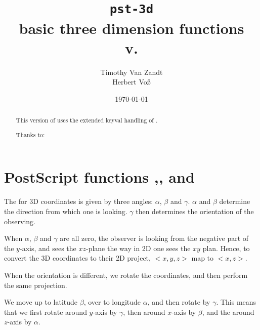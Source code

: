\documentclass[11pt,english,BCOR10mm,DIV12,bibliography=totoc,parskip=false,smallheadings
    headexclude,footexclude,oneside,dvipsnames,svgnames]{pst-doc}
\let\pstFV\fileversion
\def\la{<}
\def\ra{>}
\begin{document}
\title{\texttt{pst-3d}\\basic three dimension functions \\\small v.\pstFV}
\author{Timothy Van Zandt\\Herbert Vo\ss}
\date{\today}

\maketitle

\begin{abstract}
This version of  uses the extended keyval handling
of .

\vfill
\noindent
Thanks to:  
\end{abstract}

\clearpage
\tableofcontents

\clearpage

\section[PostScript]{PostScript functions ,, and }
The  for 3D coordinates is given by three angles: $\alpha$, $\beta$ and
 $\gamma$. $\alpha$ and $\beta$ determine the direction from which one is
 looking. $\gamma$ then determines the orientation of the observing.

 When $\alpha$, $\beta$ and $\gamma$ are all zero, the observer is looking
 from the negative part of the $y$-axis, and sees the $xz$-plane the way in
 2D one sees the $xy$ plan. Hence, to convert the 3D coordinates to their 2D
 project, $\la x, y, z\ra$ map to $\la x, z\ra$.

 When the orientation is different, we rotate the coordinates, and then
 perform the same projection.

 We move up to latitude $\beta$, over to longitude $\alpha$, and then rotate
 by $\gamma$. This means that we first rotate around $y$-axis by $\gamma$,
 then around $x$-axis by $\beta$, and the around $z$-axis by $\alpha$.
\end{document}
